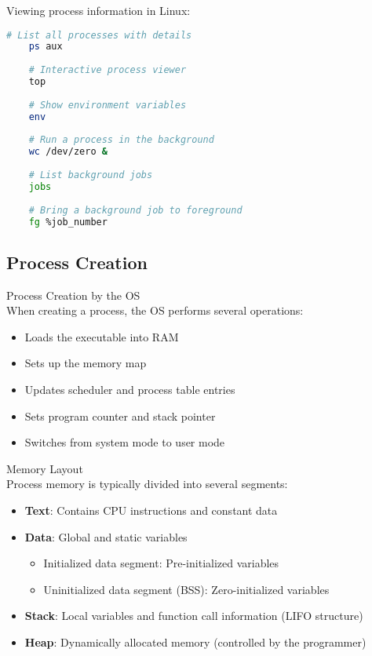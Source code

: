 \begin{example}
    Viewing process information in Linux:
    \begin{lstlisting}[language=bash, style=basesmol]
    # List all processes with details
    ps aux
    
    # Interactive process viewer
    top
    
    # Show environment variables
    env
    
    # Run a process in the background
    wc /dev/zero &
    
    # List background jobs
    jobs
    
    # Bring a background job to foreground
    fg %job_number
    \end{lstlisting}
\end{example}

\subsection{Process Creation}

\begin{definition}{Process Creation by the OS}\\
    When creating a process, the OS performs several operations:
    \begin{itemize}
        \item Loads the executable into RAM
        \item Sets up the memory map
        \item Updates scheduler and process table entries
        \item Sets program counter and stack pointer
        \item Switches from system mode to user mode
    \end{itemize}
\end{definition}

\begin{definition}{Memory Layout}\\
    Process memory is typically divided into several segments:
    \begin{itemize}
        \item \textbf{Text}: Contains CPU instructions and constant data
        \item \textbf{Data}: Global and static variables
            \begin{itemize}
                \item Initialized data segment: Pre-initialized variables
                \item Uninitialized data segment (BSS): Zero-initialized variables
            \end{itemize}
        \item \textbf{Stack}: Local variables and function call information (LIFO structure)
        \item \textbf{Heap}: Dynamically allocated memory (controlled by the programmer)
    \end{itemize}
\end{definition}

